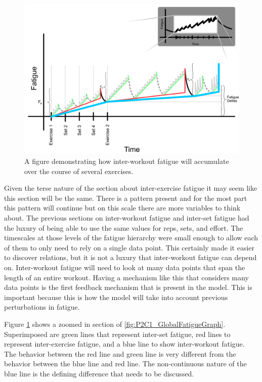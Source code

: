 \begin{figure}[htb]
    \centering
    \includegraphics[scale=0.55]{images/ch2/InterWorkoutFatigue.png}
    \caption{A figure demonstrating how inter-workout fatigue will accumulate over the course of several exercises.}
    \label{fig:P2C1_InterWorkoutFatigue}
\end{figure}

Given the terse nature of the section about inter-exercise fatigue it may seem like this section will be the same. There is a pattern present and for the most part this pattern will continue but on this scale there are more variables to think about. The previous sections on inter-workout fatigue and inter-set fatigue had the luxury of being able to use the same values for reps, sets, and effort. The timescales at those levels of the fatigue hierarchy were small enough to allow each of them to only need to rely on a single data point. This certainly made it easier to discover relations, but it is not a luxury that inter-workout fatigue can depend on. Inter-workout fatigue will need to look at many data points that span the length of an entire workout. Having a mechanism like this that considers many data points is the first feedback mechanism that is present in the model. This is important because this is how the model will take into account previous perturbations in fatigue.

Figure \ref{fig:P2C1_InterWorkoutFatigue} shows a zoomed in section of \ref{fig:P2C1_GlobalFatigueGraph}. Superimposed are green lines that represent inter-set fatigue, red lines to represent inter-exercise fatigue, and a blue line to show inter-workout fatigue. The behavior between the red line and green line is very different from the behavior between the blue line and red line. The non-continuous nature of the blue line is the defining difference that needs to be discussed.

